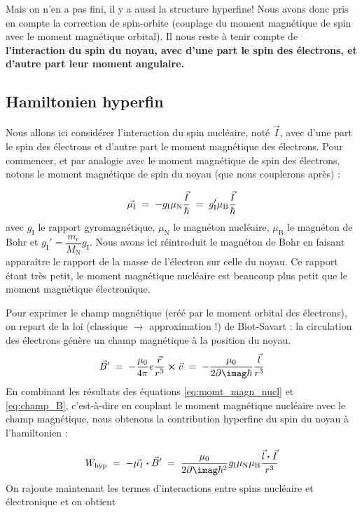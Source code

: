 Mais on n’en a pas fini, il y a aussi la structure hyperfine! Nous avons donc pris en compte la correction de spin-orbite (couplage du moment magnétique de spin avec le moment magnétique orbital). Il nous reste à tenir compte de \textbf{l’interaction du spin du noyau, avec d'une part le spin des électrons, et d'autre part leur moment angulaire.}



\subsection{Hamiltonien hyperfin}

Nous allons ici considérer l'interaction du spin nucléaire, noté $\vec{I}$, avec d'une part le spin des électrons et d'autre part le moment magnétique des électrons. Pour commencer, et par analogie avec le moment magnétique de spin des électrons, notons le moment magnétique de spin du noyau (que nous couplerons après) :

\begin{equation}
    \vec{\mu_\text{I}}
    \; = \; -g_\text{I}\mu_\text{N}\dfrac{\vec{I}}{\hbar}
    \; = \;  g_\text{I}'\mu_\text{B}\dfrac{\vec{I}}{\hbar}
    \label{eq:momt_magn_nucl}
\end{equation}
avec $g_\text{I}$ le rapport gyromagnétique, $\mu_\text{N}$ le magnéton nucléaire, $\mu_\text{B}$ le magnéton de Bohr et $g_\text{I}'=\dfrac{m_e}{M_\text{N}}g_\text{I}$. Nous avons ici réintroduit le magnéton de Bohr en faisant apparaître le rapport de la masse de l’électron sur celle du noyau. Ce rapport étant très petit, le moment magnétique nucléaire est beaucoup plus petit que le moment magnétique électronique.

Pour exprimer le champ magnétique (créé par le moment orbital des électrons), on repart de la loi (classique $\longrightarrow$ approximation !) de Biot-Savart : la circulation des électrons génère un champ magnétique à la position du noyau.
\begin{equation}
    \vec{B}' \eq
    -\dfrac{\mu_0}{4\pi}e\dfrac{\vec{r}}{r^3}\cross \vec{v} \eq
    -\dfrac{\mu_0}{2\p\imag\hbar}\dfrac{\vec{l}}{r^3}
    \label{eq:champ_B}
\end{equation}
En combinant les résultats des équations \eqref{eq:momt_magn_nucl} et \eqref{eq:champ_B}, c'est-à-dire en couplant le moment magnétique nucléaire avec le champ magnétique, nous obtenons la contribution hyperfine du spin du noyau à l'hamiltonien :

\[
    W_\text{hyp} \eq
    - \vec{\mu_I} \Cdot \vec{B}'
    \eq
    \dfrac{\mu_0}{2\p\imag\hbar^2} g_\text{I} \mu_\text{N} \mu_\text{B} \dfrac{\vec{l}\Cdot\vec{I}}{r^3}
\]
On rajoute maintenant les termes d'interactions entre spins nucléaire et électronique et on obtient

